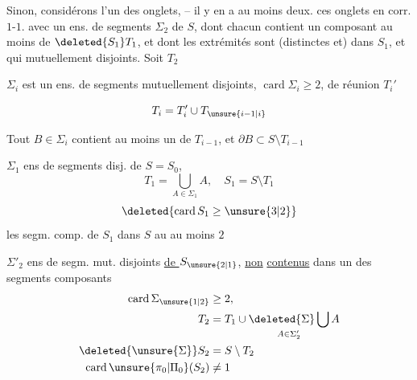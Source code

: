 Sinon, considérons l'un des onglets,  -- il y en a au moins deux.  ces onglets  en corr. $1$-$1$. avec un ens. de \unsure{(}segments $\Sigma_2$ de $S$, dont chacun contient un composant au moins de $\deleted{S_1}T_1$, et dont les extrémités sont (distinctes et) dans $S_1$, et qui  mutuellement disjoints. Soit $T_2$


$\Sigma_i$ est un ens. de segments  mutuellement disjoints, $\operatorname{card}\Sigma_i\geq 2$,  de réunion $T_i'$ 

\reversemarginpar{} \[T_i=T_i'\cup T_{\unsure{i-1|i}}\] \noindent\llap{\rule[-2\baselineskip]{.4pt}{3\baselineskip}\hspace{.4em}}

Tout $B\in\Sigma_i$ contient au moins un   de $T_{i-1}$, et $\partial B\subset S\setminus T_{i-1}$ \normalmarginpar

\noindent\begin{minipage}[t]{.46\linewidth}
$\Sigma_1$ ens de segments  disj. de $S=S_0$,   \[T_1=\bigcup_{A\in\Sigma_1} A,\quad S_1=S\setminus T_1\] \[\deleted{\operatorname{card}S_1\geq\unsure{3|2}}\] les segm. comp. de $S_1$ dans $S$ au  au moins $2$
\end{minipage}\hfill\begin{minipage}[t]{.51\linewidth}
$\Sigma'_2$ ens de segm. mut. disjoints \uline{de $S_{\unsure{2|1}}$}, \uline{non} \uline{contenus} dans un des segments composants \[\begin{aligned}\operatorname{card}\Sigma_{\unsure{1|2}}&\geq 2,\\ T_2&=T_1\cup\mathop{\deleted{\Sigma}\bigcup}\limits_{A\in\Sigma'_2} A\\ \deleted{\unsure{\Sigma}}S_2&=S\setminus T_2\\ \operatorname{card}\unsure{\pi_0|\Pi_0}(S_2)&\ne 1\end{aligned}\]
\end{minipage}

